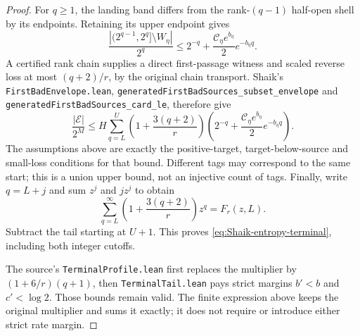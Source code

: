 \begin{proof}
For \(q\ge1\), the landing band differs from the rank-\((q-1)\)
half-open shell by its endpoints. Retaining its upper endpoint gives
\[
 \frac{|(2^{q-1},2^q]\setminus W_\eta|}{2^q}
 \le 2^{-q}+\frac{\mathcal C_\eta e^{b_\eta}}2 e^{-b_\eta q}.
\]
A certified rank chain supplies a direct first-passage witness and
scaled reverse loss at most \((q+2)/r\), by the original chain
transport. Shaik's \texttt{FirstBadEnvelope.lean},
\texttt{generatedFirstBadSources\_subset\_envelope} and
\texttt{generatedFirstBadSources\_card\_le}, therefore give
\[
 \frac{|\mathcal E|}{2^M}\le
 H\sum_{q=L}^{U}\left(1+\frac{3(q+2)}r\right)
 \left(2^{-q}+\frac{\mathcal C_\eta e^{b_\eta}}2 e^{-b_\eta q}\right).
\]
The assumptions above are exactly the positive-target,
target-below-source and small-loss conditions for that bound.
Different tags may correspond to the same start; this is a union
upper bound, not an injective count of tags.
Finally, write \(q=L+j\) and sum \(z^j\) and \(jz^j\) to obtain
\[
 \sum_{q=L}^\infty\left(1+\frac{3(q+2)}r\right)z^q=F_r(z,L).
\]
Subtract the tail starting at \(U+1\). This proves
\eqref{eq:Shaik-entropy-terminal}, including both integer cutoffs.

The source's \texttt{TerminalProfile.lean} first replaces the multiplier
by \((1+6/r)(q+1)\), then \texttt{TerminalTail.lean} pays strict margins
\(b'<b\) and \(c'<\log2\). Those bounds remain valid.
The finite expression above keeps the original multiplier and sums it
exactly; it does not require or introduce either strict rate margin.
\end{proof}

